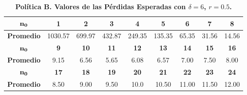 \begin{table}\small
\centering
\caption{\bf Pol\'itica B. Valores de las P\'erdidas Esperadas con $\delta=6$, $r=0.5$.}\label{tt7}
\begin{tabular}{ccccccccc}
\toprule[0.6mm]
$\bf{n_0}$ &\bf{1} &                   \bf{2} &                   \bf{3} &                   \bf{ 4 }&                    \bf{ 5}&              \bf{ 6} &               \bf{ 7} & \bf{8} \\
\hline
{\bf Promedio} & 1030.57 & 699.97&  432.87 & 249.35 & 135.35  & 65.35 &  31.56 &  14.56  \\
\hline
$\bf{n_0}$&\bf{9} &                \bf{ 10}&              \bf{      11} &                   \bf{ 12} &               \bf{      13}&              \bf{14} &  \bf{ 15} & \bf{16 }   \\
\hline
{\bf Promedio}&	9.15 &   6.56 &   5.65  &  6.08  &  6.57 &   7.00  &  7.50 & 8.00  \\
	 \hline
	
$\bf{n_0}$&\bf{17} &     \bf{ 18}&   \bf{19}&   \bf{ 20} &           \bf{   21}&                \bf{  22}  & \bf{23} &  \bf{24}\\
\hline
{\bf Promedio} &    8.50 &   9.00  &  9.50  &  10.0 &  10.50 &  11.00  & 11.50& 12.00\\
\toprule[0.6mm]
\end{tabular}

\end{table}

 

  


